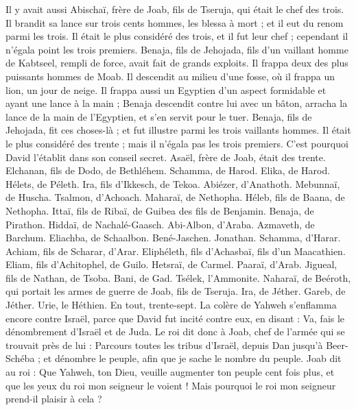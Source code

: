 \begin{multicols}{2}
Il y avait aussi Abischaï, frère de Joab, fils de Tseruja, qui était le chef des trois. Il brandit sa lance sur trois cents hommes, les blessa à mort ; et il eut du renom parmi les trois.
Il était le plus considéré des trois, et il fut leur chef ; cependant il n’égala point les trois premiers.
Benaja, fils de Jehojada, fils d'un vaillant homme de Kabtseel, rempli de force, avait fait de grands exploits. Il frappa deux des plus puissants hommes de Moab. Il descendit au milieu d’une fosse, où il frappa un lion, un jour de neige.
Il frappa aussi un Egyptien d’un aspect formidable et ayant une lance à la main ; Benaja descendit contre lui avec un bâton, arracha la lance de la main de l'Egyptien, et s’en servit pour le tuer.
Benaja, fils de Jehojada, fit ces choses-là ; et fut illustre parmi les trois vaillants hommes.
Il était le plus considéré des trente ; mais il n'égala pas les trois premiers. C'est pourquoi David l'établit dans son conseil secret.
Asaël, frère de Joab, était des trente. Elchanan, fils de Dodo, de Bethléhem.
Schamma, de Harod. Elika, de Harod.
Hélets, de Péleth. Ira, fils d’Ikkesch, de Tekoa.
Abiézer, d’Anathoth. Mebunnaï, de Huscha.
Tsalmon, d’Achoach. Maharaï, de Nethopha.
Héleb, fils de Baana, de Nethopha. Ittaï, fils de Ribaï, de Guibea des fils de Benjamin.
Benaja, de Pirathon. Hiddaï, de Nachalé-Gaasch.
Abi-Albon, d’Araba. Azmaveth, de Barchum.
Eliachba, de Schaalbon. Bené-Jaschen. Jonathan.
Schamma, d’Harar. Achiam, fils de Scharar, d’Arar.
Eliphéleth, fils d'Achasbaï, fils d’un Maacathien. Eliam, fils d'Achitophel, de Guilo.
Hetsraï, de Carmel. Paaraï, d’Arab.
Jigueal, fils de Nathan, de Tsoba. Bani, de Gad.
Tsélek, l’Ammonite. Naharaï, de Beéroth, qui portait les armes de guerre de Joab, fils de Tseruja.
Ira, de Jéther. Gareb, de Jéther.
Urie, le Héthien. En tout, trente-sept.
\VerseOne{}La colère de Yahweh s'enflamma encore contre Israël, parce que David fut incité contre eux, en disant : Va, fais le dénombrement d'Israël et de Juda.
Le roi dit donc à Joab, chef de l'armée qui se trouvait près de lui : Parcours toutes les tribus d'Israël, depuis Dan jusqu'à Beer-Schéba ; et dénombre le peuple, afin que je sache le nombre du peuple.
Joab dit au roi : Que Yahweh, ton Dieu, veuille augmenter ton peuple cent fois plus, et que les yeux du roi mon seigneur le voient ! Mais pourquoi le roi mon seigneur prend-il plaisir à cela ?

\end{multicols}
